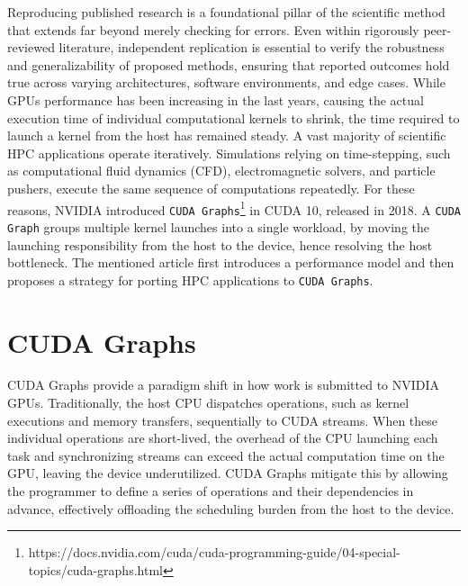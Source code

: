 \documentclass[10pt,twocolumn]{article}
\begin{document}
Reproducing published research is a foundational pillar of the scientific method that extends far beyond merely checking for errors. 
Even within rigorously peer-reviewed literature, independent replication is essential to verify the robustness and generalizability of proposed methods, ensuring that reported outcomes hold true across varying architectures, software environments, and edge cases. 
While GPUs performance has been increasing in the last years, causing the actual execution time of individual computational kernels to shrink, the time required to launch a kernel from the host has remained steady. 
A vast majority of scientific HPC applications operate iteratively. Simulations relying on time-stepping, such as computational fluid dynamics (CFD), electromagnetic solvers, and particle pushers, execute the same sequence of computations repeatedly.
For these reasons, NVIDIA introduced \texttt{CUDA Graphs}\footnote{https://docs.nvidia.com/cuda/cuda-programming-guide/04-special-topics/cuda-graphs.html} in CUDA 10, released in 2018.
A \texttt{CUDA Graph} groups multiple kernel launches into a single workload, by moving the launching responsibility from the host to the device, hence resolving the host bottleneck.
The mentioned article first introduces a performance model and then proposes a strategy for porting HPC applications to \texttt{CUDA Graphs}.

\section{CUDA Graphs}
CUDA Graphs provide a paradigm shift in how work is submitted to NVIDIA GPUs. 
Traditionally, the host CPU dispatches operations, such as kernel executions and memory transfers, sequentially to CUDA streams. 
When these individual operations are short-lived, the overhead of the CPU launching each task and synchronizing streams can exceed the actual computation time on the GPU, leaving the device underutilized. 
CUDA Graphs mitigate this by allowing the programmer to define a series of operations and their dependencies in advance, effectively offloading the scheduling burden from the host to the device.
\end{document}
